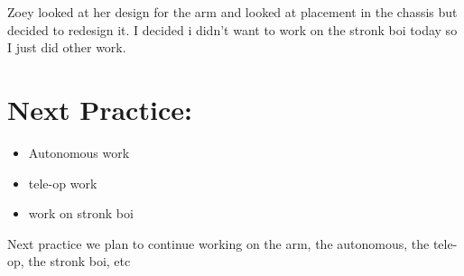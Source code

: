 \documentclass[12pt]{article}
\begin{document}
Zoey looked at her design for the arm and looked at placement in the chassis but decided to redesign it. I decided i didn't want to work on the stronk boi today so I just did other work.

\section{Next Practice:}
\begin{itemize}
	\item Autonomous work
\item tele-op work
\item work on stronk boi
\end{itemize}

Next practice we plan to continue working on the arm, the autonomous, the tele-op, the stronk boi, etc
\end{document}
